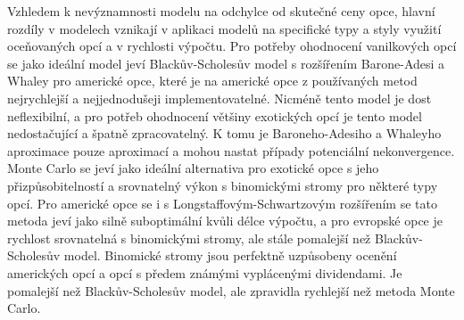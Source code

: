 \documentclass[male,czech,api_bc]{kitheses}
\begin{document}
  Vzhledem k nevýznamnosti modelu na odchylce od skutečné ceny opce, hlavní rozdíly v modelech vznikají v aplikaci modelů na specifické typy a styly využití oceňovaných opcí a v rychlosti výpočtu.  
  Pro potřeby ohodnocení vanilkových opcí se jako ideální model jeví Blackův-Scholesův model s rozšířením Barone-Adesi a Whaley pro americké opce, které je na americké opce z používaných metod nejrychlejší a nejjednodušeji implementovatelné. Nicméně tento model je dost neflexibilní, a pro potřeb ohodnocení většiny exotických opcí je tento model nedostačující a špatně zpracovatelný. K tomu je Baroneho-Adesiho a Whaleyho aproximace pouze aproximací a mohou nastat případy potenciální nekonvergence.
  Monte Carlo se jeví jako ideální alternativa pro exotické opce s jeho přizpůsobitelností a srovnatelný výkon s binomickými stromy pro některé typy opcí. Pro americké opce se i s Longstaffovým-Schwartzovým rozšířením se tato metoda jeví jako silně suboptimální kvůli délce výpočtu, a pro evropské opce je rychlost srovnatelná s binomickými stromy, ale stále pomalejší než Blackův-Scholesův model.
  Binomické stromy jsou perfektně uzpůsobeny ocenění amerických opcí a opcí s předem známými vyplácenými dividendami. Je pomalejší než Blackův-Scholesův model, ale zpravidla rychlejší než metoda Monte Carlo.

  \printbibliography
  
\end{document}
